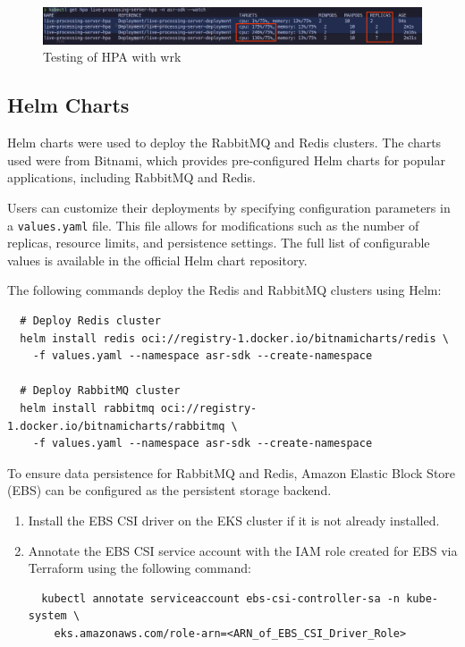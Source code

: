 \begin{figure}[!h]
  \centering
  \includegraphics[width=\textwidth]{figures/hpa_cli.png}
  \caption{Testing of HPA with wrk}
  \label{fig:hpa_cli}
\end{figure}

\subsection{Helm Charts}
Helm charts were used to deploy the RabbitMQ and Redis clusters. The charts used were from Bitnami, which provides pre-configured Helm charts for popular applications, including RabbitMQ and Redis.

Users can customize their deployments by specifying configuration parameters in a \texttt{values.yaml} file. This file allows for modifications such as the number of replicas, resource limits, and persistence settings. The full list of configurable values is available in the official Helm chart repository.


The following commands deploy the Redis and RabbitMQ clusters using Helm:
\begin{verbatim}
  # Deploy Redis cluster
  helm install redis oci://registry-1.docker.io/bitnamicharts/redis \
    -f values.yaml --namespace asr-sdk --create-namespace
  
  # Deploy RabbitMQ cluster
  helm install rabbitmq oci://registry-1.docker.io/bitnamicharts/rabbitmq \
    -f values.yaml --namespace asr-sdk --create-namespace
\end{verbatim}

To ensure data persistence for RabbitMQ and Redis, Amazon Elastic Block Store (EBS) can be configured as the persistent storage backend.
\begin{enumerate}
  \item Install the EBS CSI driver on the EKS cluster if it is not already installed.
  \item Annotate the EBS CSI service account with the IAM role created for EBS via Terraform using the following command:
  \begin{verbatim} 
  kubectl annotate serviceaccount ebs-csi-controller-sa -n kube-system \
    eks.amazonaws.com/role-arn=<ARN_of_EBS_CSI_Driver_Role>
  \end{verbatim}
\end{enumerate}

